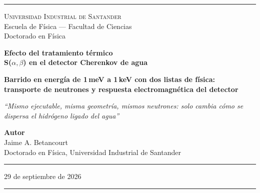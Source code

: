 \documentclass[11pt,a4paper]{article}
\begin{document}
\pagestyle{empty}

\begin{titlepage}
\begin{center}

\vspace*{0.5cm}
\textcolor{reglaColor}{\rule{\linewidth}{1.2pt}}

\vspace{1.3cm}
{\Large\scshape Universidad Industrial de Santander}\\[0.2cm]
{\large Escuela de Física --- Facultad de Ciencias}\\[0.2cm]
{\large Doctorado en Física}

\vspace{2.2cm}
{\Huge\bfseries\color{tituloColor} Efecto del tratamiento térmico\\[0.2cm]
S($\alpha,\beta$) en el detector Cherenkov de agua}

\vspace{1.8cm}
{\large\textbf{Barrido en energía de 1\,meV a 1\,keV con dos listas de física:}}\\[0.15cm]
{\large\textbf{transporte de neutrones y respuesta electromagnética del detector}}

\vspace{0.6cm}
\begin{minipage}{0.82\linewidth}
\centering
\textit{``Mismo ejecutable, misma geometría, mismos neutrones: solo cambia cómo se dispersa el hidrógeno ligado del agua''}
\end{minipage}

\vfill

{\large\textbf{Autor}}\\[0.15cm]
Jaime A. Betancourt\\[0.1cm]
Doctorado en Física, Universidad Industrial de Santander

\vspace{1.2cm}
\textcolor{reglaColor}{\rule{0.5\linewidth}{0.6pt}}

\vspace{1cm}
29 de septiembre de 2026

\vspace{1cm}
\textcolor{reglaColor}{\rule{\linewidth}{1.2pt}}

\end{center}
\end{titlepage}

\pagestyle{plain}
\end{document}
